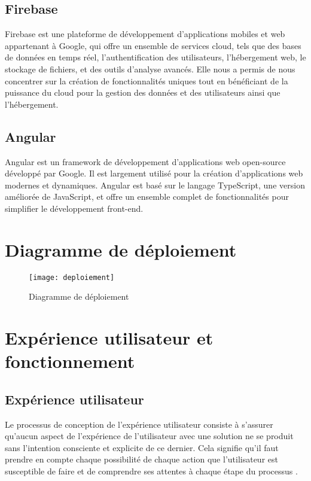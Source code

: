 \subsection{Firebase}
Firebase est une plateforme de développement d'applications mobiles et web appartenant à Google, qui offre un ensemble de services cloud, tels que des bases de données en temps réel, l'authentification des utilisateurs, l'hébergement web, le stockage de fichiers, et des outils d'analyse avancés. Elle nous a permis de nous concentrer sur la création de fonctionnalités uniques tout en bénéficiant de la puissance du cloud pour la gestion des données et des utilisateurs ainsi que l'hébergement.

\subsection{Angular}
Angular est un framework de développement d'applications web open-source développé par Google. Il est largement utilisé pour la création d'applications web modernes et dynamiques. Angular est basé sur le langage TypeScript, une version améliorée de JavaScript, et offre un ensemble complet de fonctionnalités pour simplifier le développement front-end.

\section{Diagramme de déploiement}
\begin{figure}[H]
	\centering
	\texttt{[image: deploiement]}
	\caption{Diagramme de déploiement}
\end{figure}

\section{Expérience utilisateur et fonctionnement}
\subsection{Expérience utilisateur}
Le processus de conception de l'expérience utilisateur consiste à s'assurer qu'aucun aspect de l'expérience de l'utilisateur avec une solution ne se produit sans l’intention consciente et explicite de ce dernier. Cela signifie qu'il faut prendre en compte chaque possibilité de chaque action que l'utilisateur est susceptible de faire et de comprendre ses attentes à chaque étape du processus \cite{jesse_james_garrett_elements}.\\


